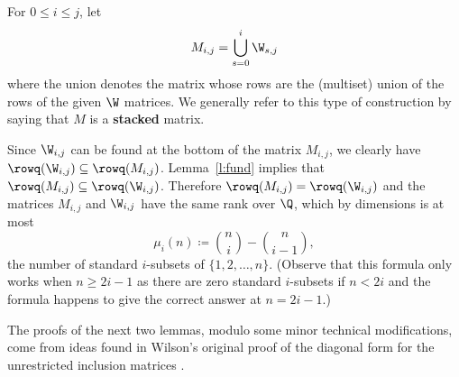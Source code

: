 \begin{definition}\label{d:stack}
For $0 \leq i \leq j$, let
\[ M_{i,j} = \bigcup_{s=0}^{i}\W_{s,j} \]
where the union denotes the matrix whose rows are the (multiset) union of the rows of the given $\W$ matrices.  We generally refer to this type of construction by saying that $M$ is a {\bf stacked} matrix.
\end{definition}

Since $\W_{i,j}$ can be found at the bottom of the matrix $M_{i,j}$, we clearly have $\rowq(\W_{i,j}) \subseteq \rowq(M_{i,j})$.  Lemma~\ref{l:fund} implies that $\rowq(M_{i,j}) \subseteq \rowq(\W_{i,j})$.  Therefore $\rowq(M_{i,j}) = \rowq(\W_{i,j})$ and the matrices $M_{i,j}$ and $\W_{i,j}$ have the same rank over $\Q$, which by dimensions is at most 
\[ \mu_{i}(n) \coloneqq  \binom{n}{i} - \binom{n}{i-1}, \]
the number of standard $i$-subsets of $\{1, 2, \ldots, n\}$.  (Observe that this formula only works when $n \geq 2i-1$ as there are zero standard $i$-subsets if $n < 2i$ and the formula happens to give the correct answer at $n = 2i-1$.)  

The proofs of the next two lemmas, modulo some minor technical modifications, come from ideas found in Wilson's original proof of the diagonal form for the unrestricted inclusion matrices \cite{wilson_classic}.

